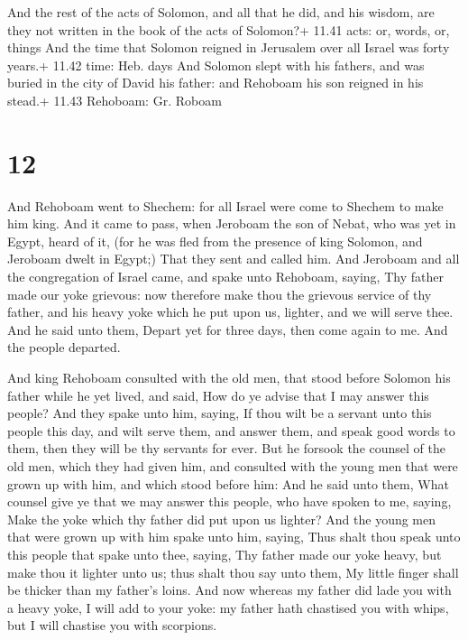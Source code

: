  And the rest of the acts of Solomon, and all that he
did, and his wisdom, are they not written in the book of the acts of
Solomon?+ 11.41 acts: or, words, or, things  And the time
that Solomon reigned in Jerusalem over all Israel was forty years.+
11.42 time: Heb. days  And Solomon slept with his fathers,
and was buried in the city of David his father: and Rehoboam his son
reigned in his stead.+ 11.43 Rehoboam: Gr. Roboam

\hypertarget{section-11}{%
\section{12}\label{section-11}}

 And Rehoboam went to Shechem: for all Israel were come to
Shechem to make him king.  And it came to pass, when
Jeroboam the son of Nebat, who was yet in Egypt, heard of it, (for he
was fled from the presence of king Solomon, and Jeroboam dwelt in
Egypt;)  That they sent and called him. And Jeroboam and all
the congregation of Israel came, and spake unto Rehoboam, saying,
 Thy father made our yoke grievous: now therefore make thou
the grievous service of thy father, and his heavy yoke which he put upon
us, lighter, and we will serve thee.  And he said unto them,
Depart yet for three days, then come again to me. And the people
departed.

 And king Rehoboam consulted with the old men, that stood
before Solomon his father while he yet lived, and said, How do ye advise
that I may answer this people?  And they spake unto him,
saying, If thou wilt be a servant unto this people this day, and wilt
serve them, and answer them, and speak good words to them, then they
will be thy servants for ever.  But he forsook the counsel
of the old men, which they had given him, and consulted with the young
men that were grown up with him, and which stood before him:
 And he said unto them, What counsel give ye that we may
answer this people, who have spoken to me, saying, Make the yoke which
thy father did put upon us lighter?  And the young men that
were grown up with him spake unto him, saying, Thus shalt thou speak
unto this people that spake unto thee, saying, Thy father made our yoke
heavy, but make thou it lighter unto us; thus shalt thou say unto them,
My little finger shall be thicker than my father's loins. 
And now whereas my father did lade you with a heavy yoke, I will add to
your yoke: my father hath chastised you with whips, but I will chastise
you with scorpions.

